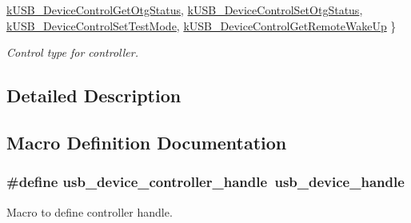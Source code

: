 \begin{DoxyCompactItemize}
\hyperlink{group__usb__device__controller__driver_ggaa7a58da69289c9e774119a7998835c54a47e409659c5b7c11a8aa26ad4ec65279}{k\-U\-S\-B\-\_\-\-Device\-Control\-Get\-Otg\-Status}, 
\hyperlink{group__usb__device__controller__driver_ggaa7a58da69289c9e774119a7998835c54a9b5a35a9f0054382e96410fffb7f2e8b}{k\-U\-S\-B\-\_\-\-Device\-Control\-Set\-Otg\-Status}, 
\hyperlink{group__usb__device__controller__driver_ggaa7a58da69289c9e774119a7998835c54ad3c6f680a4c3f112607d3a582b8b2cd8}{k\-U\-S\-B\-\_\-\-Device\-Control\-Set\-Test\-Mode}, 
\hyperlink{group__usb__device__controller__driver_ggaa7a58da69289c9e774119a7998835c54a268bbf4bd031a441273508f75d24ddc4}{k\-U\-S\-B\-\_\-\-Device\-Control\-Get\-Remote\-Wake\-Up}
 \}
\begin{DoxyCompactList}\small\item\em Control type for controller. \end{DoxyCompactList}\end{DoxyCompactItemize}


\subsection{Detailed Description}


\subsection{Macro Definition Documentation}
\hypertarget{group__usb__device__controller__driver_gaec03ce2e4732aa876cd2a91cf8e93b5b}{
\subsubsection[{usb\-\_\-device\-\_\-controller\-\_\-handle}]{\setlength{\rightskip}{0pt plus 5cm}\#define usb\-\_\-device\-\_\-controller\-\_\-handle~{\bf usb\-\_\-device\-\_\-handle}}}\label{group__usb__device__controller__driver_gaec03ce2e4732aa876cd2a91cf8e93b5b}


Macro to define controller handle. 



